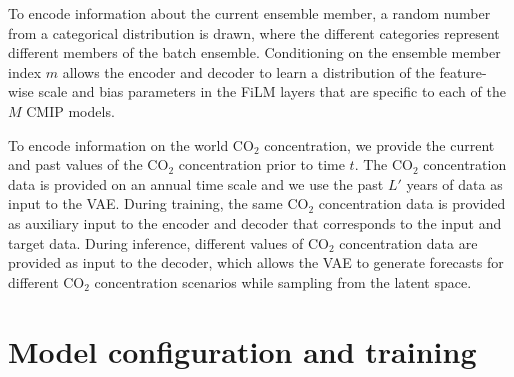 \documentclass[english,a4paper,10pt]{scrartcl}
\begin{document}
To encode information about the current ensemble member, a random number from a categorical distribution is drawn, where the different categories represent different members of the batch ensemble. Conditioning on the ensemble member index $m$ allows the encoder and decoder to learn a distribution of the feature-wise scale and bias parameters in the FiLM layers that are specific to each of the $M$ CMIP models.

To encode information on the world CO$_2$ concentration, we provide the current and past values of the CO$_2$ concentration prior to time $t$. The CO$_2$ concentration data is provided on an annual time scale and we use the past $L'$ years of data as input to the VAE. During training, the same CO$_2$ concentration data is provided as auxiliary input to the encoder and decoder that corresponds to the input and target data. During inference, different values of CO$_2$ concentration data are provided as input to the decoder, which allows the VAE to generate forecasts for different CO$_2$ concentration scenarios while sampling from the latent space.

\section{Model configuration and training}\label{sec:model-params-training}
\end{document}
